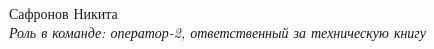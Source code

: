 \begin{figure}[H]
\begin{minipage}[h]{0.47\linewidth}
		\\
		Сафронов Никита\\
		\emph{Роль в команде: оператор-2, ответственный за техническую книгу}
	\end{minipage}
	\hfill
	\begin{minipage}[h]{0.47\linewidth}

\end{minipage}
\end{figure}
